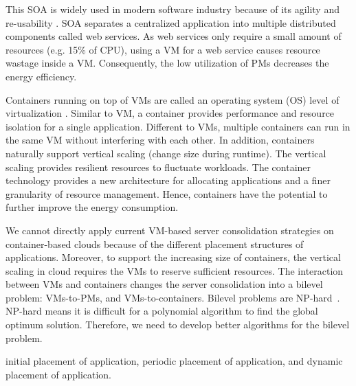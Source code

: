  This SOA is widely used in modern software industry because of its agility and re-usability \cite{Sprott:2004wt}.
SOA separates a centralized application into multiple distributed components called web services. 
As web services only require a small amount of resources (e.g. 15\% of CPU), 
using a VM for a web service causes resource wastage inside a VM. Consequently, the low utilization of PMs decreases
the energy efficiency.


 Containers running on top of 
VMs are called an operating system (OS) level of virtualization \cite{Soltesz:2007cu}. Similar to VM, 
a container provides performance and resource isolation for a single application. 
Different to VMs, multiple containers can run in the same VM without interfering with each other. 
In addition, containers naturally support vertical scaling (change size during runtime)\cite{Vaquero:2011gb}. 
The vertical scaling provides resilient resources to fluctuate workloads. The container technology provides a new 
architecture for allocating applications and a finer granularity of resource management. Hence, containers have the potential to further
improve the energy consumption.



We cannot directly apply current VM-based server consolidation strategies on container-based clouds because 
of the different placement structures of applications. Moreover, to support the increasing size of containers, 
the vertical scaling in cloud requires the VMs to reserve sufficient resources. The interaction between VMs and containers changes 
the server consolidation into a bilevel problem: VMs-to-PMs, and VMs-to-containers. Bilevel problems are NP-hard~\cite{Sinha:2013tn}.  NP-hard means it is difficult for a polynomial algorithm to find the global optimum solution. Therefore, we need to develop better algorithms for the bilevel problem.

initial placement of application, periodic placement of application, and dynamic placement of application.





